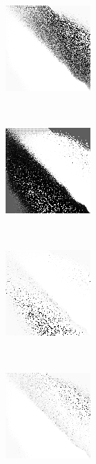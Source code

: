 
\begin{figure}
\center

	\begin{subfigure}[t]{0.22\textwidth}
		\includegraphics[width=\stratgraphwidth]{images/findings/experiments/starting_points/hand_max_min.png}
		\caption{\handmaxmin}
	\end{subfigure}
	~
	\begin{subfigure}[t]{0.22\textwidth}
		\includegraphics[width=\stratgraphwidth]{images/findings/experiments/starting_points/hand_max_avg.png}
		\caption{\handmaxavg}
	\end{subfigure}
	~
	\begin{subfigure}[t]{0.22\textwidth}
		\includegraphics[width=\stratgraphwidth]{images/findings/experiments/starting_points/hand_max_med.png}
		\caption{\handmaxmed}
	\end{subfigure}
	~
	\begin{subfigure}[t]{0.22\textwidth}
		\includegraphics[width=\stratgraphwidth]{images/findings/experiments/starting_points/hand_max_poss.png}
		\caption{\handmaxposs}
	\end{subfigure}


\end{figure}
